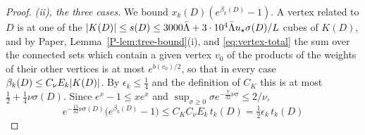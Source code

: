 \documentclass[11pt]{preprint}
\DeclarePairedDelimiter{\abs}{\lvert}{\rvert}
\numberwithin{equation}{section}
\theoremstyle{definition}
\theoremstyle{remark}
\theoremstyle{plain}
\begin{document}
\begin{proof}
\emph{(ii), the three cases.} We bound $x_k(D)(e^{\beta_k(D)} - 1)$. A vertex related to $D$ is at one of the $\abs{K(D)} \leq s(D) \leq 3000\bar\Lambda + 3 \cdot 10^4\bar\Lambda u_\star\sigma(D)/L$ cubes of $K(D)$, and by Paper, Lemma~\ref{P-lem:tree-bound}(i), and \eqref{eq:vertex-total} the sum over the connected sets which contain a given vertex $v_0$ of the products of the weights of their other vertices is at most $e^{b(v_0)/2}$, so that in every case $\beta_k(D) \leq C_\nu E_k\abs{K(D)}$. By $\epsilon_k \leq \frac14$ and the definition of $C_K$ this is at most $\frac12 + \frac14\nu\sigma(D)$. Since $e^x - 1 \leq xe^x$ and $\sup_{\sigma \geq 0}\sigma e^{-\frac{7}{32}\nu\sigma} \leq 2/\nu$,
\begin{equation}\label{eq:slot-bound}
    e^{-\frac{15}{32}\nu\sigma(D)}\bigl(e^{\beta_k(D)} - 1\bigr) \leq C_KC_\nu E_k\,t_k(D) = \tfrac12\epsilon_k\,t_k(D)
\end{equation}

\end{proof}
\end{document}
